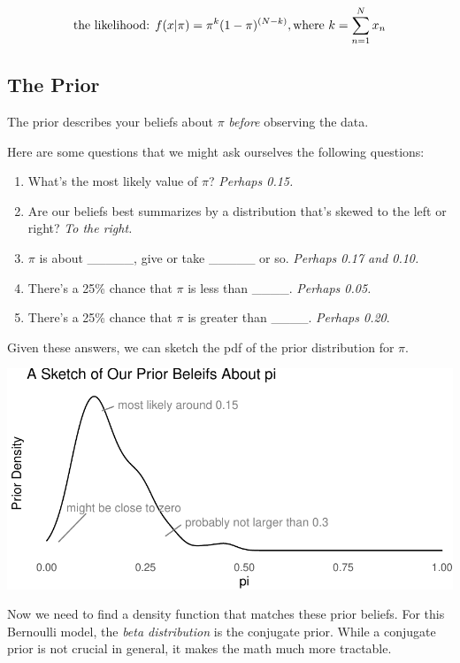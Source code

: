 \documentclass[
]{book}
\providecommand{\tightlist}{%
  \setlength{\itemsep}{0pt}\setlength{\parskip}{0pt}}
\begin{document}
\[
\text{the likelihood:  } f(x | \pi) = \pi^{k} (1 - \pi)^{(N - k)}, \text{where } k = \sum_{n = 1}^N x_n \\
\]

\hypertarget{the-prior}{%
\subsection{The Prior}\label{the-prior}}

The prior describes your beliefs about \(\pi\) \emph{before} observing
the data.

Here are some questions that we might ask ourselves the following
questions:

\begin{enumerate}
\def\labelenumi{\arabic{enumi}.}
\tightlist
\item
  What's the most likely value of \(\pi\)? \emph{Perhaps 0.15.}
\item
  Are our beliefs best summarizes by a distribution that's skewed to the
  left or right? \emph{To the right.}
\item
  \(\pi\) is about \_\_\_\_\_, give or take \_\_\_\_\_ or so.
  \emph{Perhaps 0.17 and 0.10.}
\item
  There's a 25\% chance that \(\pi\) is less than \_\_\_\_.
  \emph{Perhaps 0.05.}
\item
  There's a 25\% chance that \(\pi\) is greater than \_\_\_\_.
  \emph{Perhaps 0.20}.
\end{enumerate}

Given these answers, we can sketch the pdf of the prior distribution for
\(\pi\).

\includegraphics{02-01-bayes_files/figure-latex/unnamed-chunk-2-1.pdf}

Now we need to find a density function that matches these prior beliefs.
For this Bernoulli model, the \emph{beta distribution} is the conjugate
prior. While a conjugate prior is not crucial in general, it makes the
math much more tractable.
\end{document}
